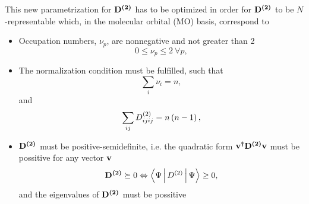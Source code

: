 This new parametrization for $\boldsymbol{\mathrm{D^{\left( 2 \right)}}}$ has to be optimized in order for
$\boldsymbol{\mathrm{D^{\left( 2 \right)}}}$ to be $N$-representable which, in the molecular
orbital (MO) basis, correspond to
\begin{itemize}
    \item Occupation numbers, $\nu_p$, are nonnegative and not greater than 2 
    \begin{equation}
        0 \le \nu_p \le 2\ \forall p,
    \end{equation}

    \item The normalization condition must be fulfilled, such that 
    \begin{equation}
        \sum_{i} \nu_i = n,
    \end{equation}
    and 
    \begin{equation}
        \sum_{ij} D^{\left( 2 \right)}_{ijij} = n\left( n-1 \right), 
    \end{equation}

    \item $\boldsymbol{\mathrm{D^{\left( 2 \right)}}}$ must be positive-semidefinite, i.e. the quadratic form
        $\boldsymbol{\mathrm{v^{\dagger} D^{\left( 2 \right)} v}}$ must be possitive for any vector $\boldsymbol{\mathrm{v}}$
        \begin{equation}
            \mat{\tedm} \succeq 0 \Leftrightarrow \Braket{\Psi | \tedm | \Psi} \ge 0,
        \end{equation}
        and the eigenvalues of $\boldsymbol{\mathrm{D^{\left( 2 \right)}}}$ must be possitive

\end{itemize}

